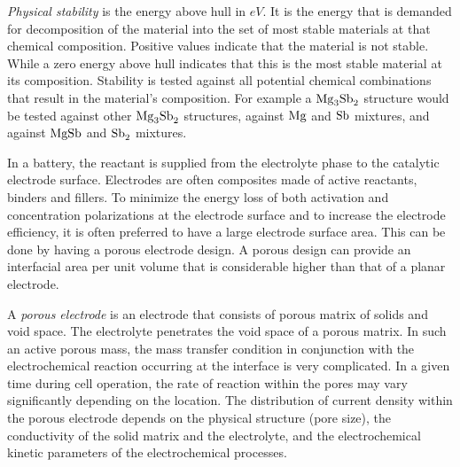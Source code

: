 	 \textit{Physical stability} is the energy above hull in $\si{eV}$. It is the energy that is demanded for decomposition of the material into the set of most stable materials at that chemical composition. Positive values indicate that the material is not stable. While a zero energy above hull indicates that this is the most stable material at its composition. Stability is tested against all potential chemical combinations that result in the material's composition. For example a $\ce{Mg_3Sb_2}$ structure would be tested against other $\ce{Mg_3Sb_2}$ structures, against $\ce{Mg}$ and $\ce{Sb}$ mixtures, and against $\ce{MgSb}$ and $\ce{Sb_2}$ mixtures.
	
	In a battery, the reactant is supplied from the electrolyte phase to the catalytic electrode surface. Electrodes are often composites made of active reactants, binders and fillers. To minimize the energy loss of both activation and concentration polarizations at the electrode surface and to increase the electrode efficiency, it is often preferred to have a large electrode surface area. This can be done by having a porous electrode design. A porous design can provide an interfacial area per unit volume that is considerable higher than that of a planar electrode.
	
	A \textit{porous electrode} is an electrode that consists of porous matrix of solids and void space. The electrolyte penetrates the void space of a porous matrix. In such an active porous mass, the mass transfer condition in conjunction with the electrochemical reaction occurring at the interface is very complicated. In a given time during cell operation, the rate of reaction within the pores may vary significantly depending on the location. The distribution of current density within the porous electrode depends on the physical structure (pore size), the conductivity of the solid matrix and the electrolyte, and the electrochemical kinetic parameters of the electrochemical processes.
	



		



